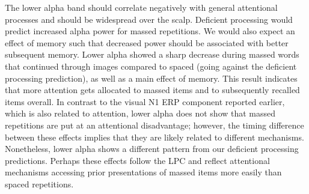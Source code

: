 


The lower alpha band should correlate negatively with general attentional processes and should be widespread over the scalp.  Deficient processing would predict increased alpha power for massed repetitions.  We would also expect an effect of memory such that decreased power should be associated with better subsequent memory.
Lower alpha showed a sharp decrease during massed words that continued through images compared to spaced (going against the deficient processing prediction), as well as a main effect of memory.  This result indicates that more attention gets allocated to massed items and to subsequently recalled items overall.  In contrast to the visual N1 ERP component reported earlier, which is also related to attention, lower alpha does not show that massed repetitions are put at an attentional disadvantage; however, the timing difference between these effects implies that they are likely related to different mechanisms.
Nonetheless, lower alpha shows a different pattern from our deficient processing predictions.
\cbstart
Perhaps these effects follow the LPC and reflect attentional mechanisms accessing prior presentations of massed items more easily than spaced repetitions.
\cbend

